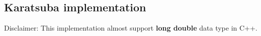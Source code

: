 \subsection{Karatsuba implementation}

Disclaimer: This implementation almost support \textbf{long double} data type in C++.


